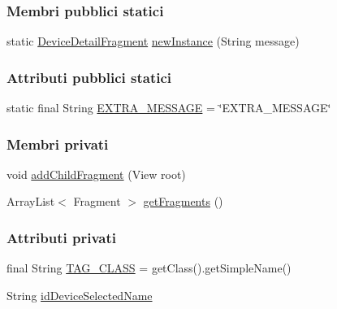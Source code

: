 \subsubsection*{Membri pubblici statici}
\begin{DoxyCompactItemize}
\item 
static \hyperlink{classit_1_1unibo_1_1torsello_1_1bluetoothpositioning_1_1fragment_1_1DeviceDetailFragment}{Device\+Detail\+Fragment} \hyperlink{classit_1_1unibo_1_1torsello_1_1bluetoothpositioning_1_1fragment_1_1DeviceDetailFragment_a626de18d36d44ae0b4ff21c2527bdf5a_a626de18d36d44ae0b4ff21c2527bdf5a}{new\+Instance} (String message)
\end{DoxyCompactItemize}
\subsubsection*{Attributi pubblici statici}
\begin{DoxyCompactItemize}
\item 
static final String \hyperlink{classit_1_1unibo_1_1torsello_1_1bluetoothpositioning_1_1fragment_1_1DeviceDetailFragment_a9f7fff4a2b22105976f2c7223d88f9ae_a9f7fff4a2b22105976f2c7223d88f9ae}{E\+X\+T\+R\+A\+\_\+\+M\+E\+S\+S\+A\+GE} = \char`\"{}E\+X\+T\+R\+A\+\_\+\+M\+E\+S\+S\+A\+GE\char`\"{}
\end{DoxyCompactItemize}
\subsubsection*{Membri privati}
\begin{DoxyCompactItemize}
\item 
void \hyperlink{classit_1_1unibo_1_1torsello_1_1bluetoothpositioning_1_1fragment_1_1DeviceDetailFragment_a62c541b8382a522f06a5d9c56cf50b26_a62c541b8382a522f06a5d9c56cf50b26}{add\+Child\+Fragment} (View root)
\item 
Array\+List$<$ Fragment $>$ \hyperlink{classit_1_1unibo_1_1torsello_1_1bluetoothpositioning_1_1fragment_1_1DeviceDetailFragment_a98e370cfcbfe5eaa4e1fe9242b00e639_a98e370cfcbfe5eaa4e1fe9242b00e639}{get\+Fragments} ()
\end{DoxyCompactItemize}
\subsubsection*{Attributi privati}
\begin{DoxyCompactItemize}
\item 
final String \hyperlink{classit_1_1unibo_1_1torsello_1_1bluetoothpositioning_1_1fragment_1_1DeviceDetailFragment_a2e4f8435039904e724f83804823e16ac_a2e4f8435039904e724f83804823e16ac}{T\+A\+G\+\_\+\+C\+L\+A\+SS} = get\+Class().get\+Simple\+Name()
\item 
String \hyperlink{classit_1_1unibo_1_1torsello_1_1bluetoothpositioning_1_1fragment_1_1DeviceDetailFragment_a6d52d8371a07fb8da75879758d1d6942_a6d52d8371a07fb8da75879758d1d6942}{id\+Device\+Selected\+Name}
\end{DoxyCompactItemize}


